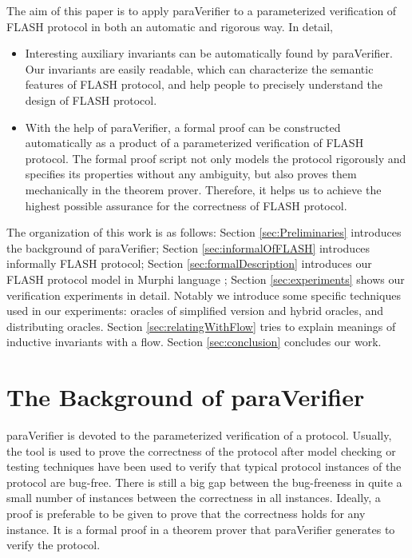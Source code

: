 \documentclass{llncs}
\newcommand{\bedt}[1]{{\color{black}#1}}
\begin{document}
The aim of this paper is to apply {\sf paraVerifier} \cite{liatva2015} to a  parameterized verification of FLASH protocol in both an automatic and rigorous way. In detail,
\begin{itemize}
\item Interesting auxiliary invariants can be  automatically found by {\sf paraVerifier}. Our invariants are \bedt{easily readable}, which can characterize the semantic features of FLASH protocol, and help people to precisely understand the design of   FLASH protocol.

\item With the help of {\sf paraVerifier}, a formal proof can be constructed automatically as a product of a parameterized verification of FLASH protocol. The formal proof script not  only models the protocol rigorously and specifies its properties without any ambiguity, but also proves them mechanically in the theorem prover. Therefore, it helps us to achieve the highest possible assurance for the correctness of FLASH protocol.


\end{itemize}

The organization of this work is as follows: Section \ref{sec:Preliminaries} introduces the background of {\sf paraVerifier}; Section  \ref{sec:informalOfFLASH} introduces informally FLASH protocol; Section \ref{sec:formalDescription} introduces our FLASH protocol model in Murphi \bedt{language} \cite{Dill1996}; Section \ref{sec:experiments} shows our verification experiments in detail. Notably we introduce some \bedt{specific techniques} used in our experiments: oracles of simplified version and hybrid oracles, and distributing oracles. Section \ref{sec:relatingWithFlow} tries to explain meanings of inductive invariants with a flow.  Section \ref{sec:conclusion} concludes our work.

\section{The Background  of {\sf paraVerifier}\label{sec:Preliminaries}}
{\sf paraVerifier} is devoted to the parameterized verification of a protocol. Usually, the tool is used to prove the correctness of the protocol after model checking or testing techniques have been used to verify that typical protocol instances of the protocol  are bug-free. There is still a big gap between the bug-freeness in quite a small number of instances between the correctness in all instances.  Ideally, a proof is preferable to be given to  prove that the correctness holds for any instance. It is a formal proof in a theorem prover that {\sf paraVerifier} generates to verify the protocol. %
\end{document}
